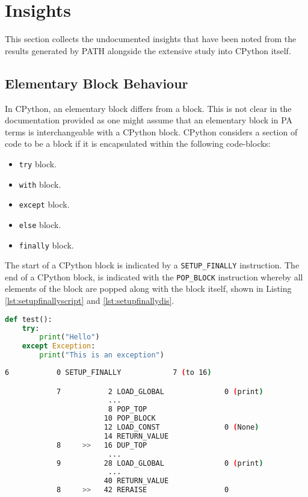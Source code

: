     \section{Insights}
    \label{sec:ins}
    \par This section collects the undocumented insights that have been noted from the results generated by \acs{PATH} alongside the extensive study into CPython itself.  
        \subsection{Elementary Block Behaviour}
        
        \par In CPython, an elementary block differs from a block. This is not clear in the documentation provided as one might assume that an elementary block in \acs{PA} terms is interchangeable with a CPython block. CPython considers a section of code to be a block if it is encapsulated within the following code-blocks:
        \begin{itemize}
            \item \lstinline|try| block.
            \item \lstinline|with| block.
            \item \lstinline|except| block.
            \item \lstinline|else| block.
            \item \lstinline|finally| block.
        \end{itemize}

        \par The start of a CPython block is indicated by a \lstinline|SETUP_FINALLY| instruction. The end of a CPython block, is indicated with the \lstinline|POP_BLOCK| instruction whereby all elements of the block are popped along with the block itself, shown in Listing \ref{lst:setupfinallyscript} and \ref{lst:setupfinallydis}.

        \begin{lstlisting}[float,language=Python,caption= \lstinline|try...except| script,label=lst:setupfinallyscript]
def test():
    try:
        print("Hello")
    except Exception:
        print("This is an exception")
        \end{lstlisting}

        \begin{lstlisting}[float,language=bash,caption= Excerpt Bytecode Dissasmbly of Listing \ref{lst:setupfinallyscript},label=lst:setupfinallydis,numbers=none]
            6           0 SETUP_FINALLY            7 (to 16)

            7           2 LOAD_GLOBAL              0 (print)
                        ...
                        8 POP_TOP
                       10 POP_BLOCK
                       12 LOAD_CONST               0 (None)
                       14 RETURN_VALUE
            8     >>   16 DUP_TOP
                        ...
            9          28 LOAD_GLOBAL              0 (print)
                        ...
                       40 RETURN_VALUE
            8     >>   42 RERAISE                  0
        \end{lstlisting}

